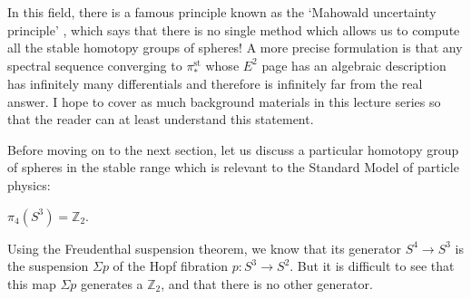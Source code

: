 \documentclass[12pt]{article}
\numberwithin{equation}{section}
\theoremstyle{remark}
\def\bZ{\mathbb{Z}}
\begin{document}
In this field, there is a famous principle known as the 
`Mahowald uncertainty principle' \cite[Sec.~3]{IsaksenICM},
which says 
that there is no single method 
which allows us to compute all the stable homotopy groups of spheres!
A more precise formulation is that 
any spectral sequence converging to $\pi^\text{st}_*$ 
whose $E^2$ page has an algebraic description 
has infinitely many differentials 
and therefore is infinitely far from the real answer.
I hope to cover as much background materials in this lecture series so that 
the reader can at least understand this statement.

Before moving on to the next section,
let us discuss a particular homotopy group of spheres in the stable range
which is relevant to the Standard Model of particle physics:
\begin{example}
  $\pi_4(S^3)=\bZ_2$.
\end{example}
Using the Freudenthal suspension theorem,
we know that its generator $S^4\to S^3$ is the suspension $\Sigma p$
of the Hopf fibration $p:S^3\to S^2$.
But it is difficult to see that this map $\Sigma p$ 
generates a $\bZ_2$, and that there is no other generator.
  
\end{document}
